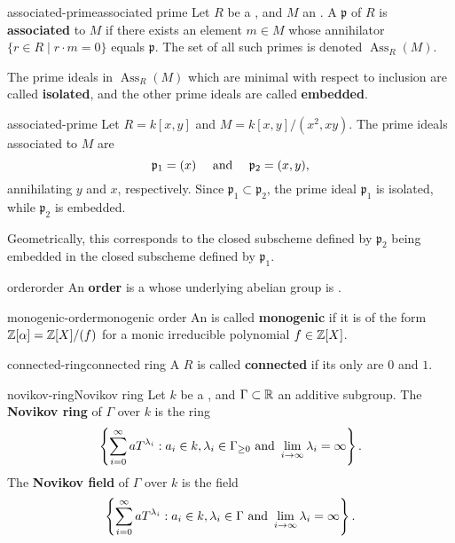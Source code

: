 \begin{topic}{associated-prime}{associated prime}
    Let $R$ be a , and $M$ an . A  $\mathfrak{p}$ of $R$ is \textbf{associated} to $M$ if there exists an element $m \in M$ whose annihilator $\{ r \in R \mid r \cdot m = 0 \}$ equals $\mathfrak{p}$. The set of all such primes is denoted $\operatorname{Ass}_R(M)$.
    
    The prime ideals in $\operatorname{Ass}_R(M)$ which are minimal with respect to inclusion are called \textbf{isolated}, and the other prime ideals are called \textbf{embedded}.
\end{topic}

\begin{example}{associated-prime}
    Let $R = k[x, y]$ and $M = k[x, y] / (x^2, xy)$. The prime ideals associated to $M$ are
    \[ \mathfrak{p}_1 = (x) \quad \textup{ and } \quad \mathfrak{p}_2 = (x, y) , \]
    annihilating $y$ and $x$, respectively. Since $\mathfrak{p}_1 \subset \mathfrak{p}_2$, the prime ideal $\mathfrak{p}_1$ is isolated, while $\mathfrak{p}_2$ is embedded.
    
    Geometrically, this corresponds to the closed subscheme defined by $\mathfrak{p}_2$ being embedded in the closed subscheme defined by $\mathfrak{p}_1$.
\end{example}

\begin{topic}{order}{order}
    An \textbf{order} is a  whose underlying abelian group is .
\end{topic}

\begin{topic}{monogenic-order}{monogenic order}
    An  is called \textbf{monogenic} if it is of the form $\mathbb{Z}[\alpha] = \mathbb{Z}[X] / (f)$ for a monic irreducible polynomial $f \in \mathbb{Z}[X]$.
\end{topic}

\begin{topic}{connected-ring}{connected ring}
    A  $R$ is called \textbf{connected} if its only  are $0$ and $1$.
\end{topic}

\begin{topic}{novikov-ring}{Novikov ring}
    Let $k$ be a , and $\Gamma \subset \mathbb{R}$ an additive subgroup. The \textbf{Novikov ring} of $\Gamma$ over $k$ is the ring
    \[ \left\{ \sum_{i = 0}^{\infty} a T^{\lambda_i} : a_i \in k, \lambda_i \in \Gamma_{\ge 0} \textup{ and } \lim_{i \to \infty} \lambda_i = \infty \right\} . \]
    The \textbf{Novikov field} of $\Gamma$ over $k$ is the field
    \[ \left\{ \sum_{i = 0}^{\infty} a T^{\lambda_i} : a_i \in k, \lambda_i \in \Gamma \textup{ and } \lim_{i \to \infty} \lambda_i = \infty \right\} . \]
\end{topic}

